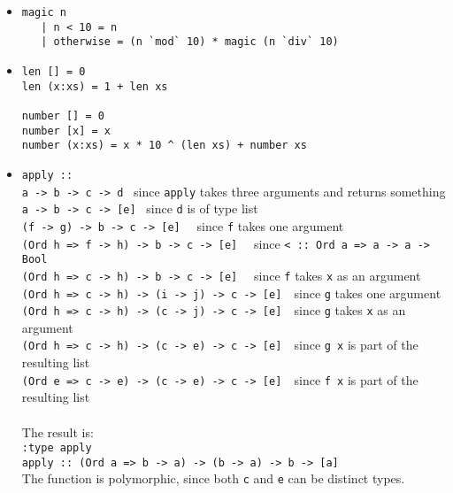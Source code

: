 \begin{itemize}
\item
\begin{verbatim}
magic n
   | n < 10 = n
   | otherwise = (n `mod` 10) * magic (n `div` 10)
\end{verbatim}
%
\item
\begin{verbatim}
len [] = 0
len (x:xs) = 1 + len xs

number [] = 0
number [x] = x
number (x:xs) = x * 10 ^ (len xs) + number xs
\end{verbatim}
%
\item
\texttt{apply ::}\\
\texttt{a -> b -> c -> d}~ since \texttt{apply} takes three arguments and returns something\\
\texttt{a -> b -> c -> [e]}~ since \texttt{d} is of type list\\
\texttt{(f -> g) -> b -> c -> [e] }~ since \texttt{f} takes one argument\\
\texttt{(Ord h => f -> h) -> b -> c -> [e] }~ since \texttt{< :: Ord a => a -> a -> Bool}\\
\texttt{(Ord h => c -> h) -> b -> c -> [e] }~ since \texttt{f} takes \texttt{x} as an argument\\
\texttt{(Ord h => c -> h) -> (i -> j) -> c -> [e] }~since \texttt{g} takes one argument\\
\texttt{(Ord h => c -> h) -> (c -> j) -> c -> [e] }~since \texttt{g} takes \texttt{x} as an argument\\
\texttt{(Ord h => c -> h) -> (c -> e) -> c -> [e] }~since \texttt{g x} is part of the resulting list\\
\texttt{(Ord e => c -> e) -> (c -> e) -> c -> [e] }~since \texttt{f x} is part of the resulting list\\
\\
The result is:\\
\texttt{:type apply}\\
\texttt{apply :: (Ord a => b -> a) -> (b -> a) -> b -> [a] }\\
The function is polymorphic, since both \texttt{c} and \texttt{e} can be distinct types.
\end{itemize}